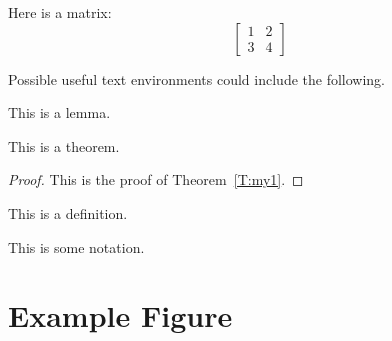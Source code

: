 Here is a matrix:
$$
\left[ \begin{matrix} 1 & 2 \\ 3 & 4 \end{matrix} \right]
$$


Possible useful text environments could include the following.

\begin{lemma} 
	This is a lemma.
\end{lemma}

\begin{theorem} \label{T:my1}
	This is a theorem.
\end{theorem}


\begin{proof}
	This is the proof of Theorem~\ref{T:my1}.
\end{proof}


\begin{definition}
	This is a definition.
\end{definition}

\begin{notation}
	This is some notation.
\end{notation}


\section{Example Figure}







